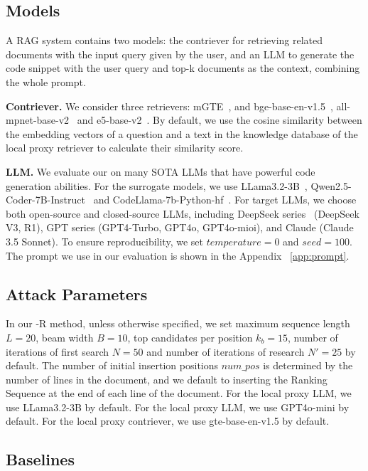 \subsection{Models}\label{subsec:models}
A RAG system contains two models: the contriever for retrieving related documents with the input query given by the user, and an LLM to generate the code snippet with the user query and top-k documents as the context, combining the whole prompt.

\textbf{Contriever.} We consider three retrievers: mGTE~\citep{mgte}, and bge-base-en-v1.5~\citep{bgeM3_embeddingmode}, all-mpnet-base-v2~\citep{all-mpnet} and e5-base-v2~\citep{e5-base}. 
By default, we use the cosine similarity between the embedding vectors of a question and a text in the knowledge database of the local proxy retriever to calculate their similarity score. 

\textbf{LLM.} We evaluate our \method on many SOTA LLMs that have powerful code generation abilities. For the surrogate models, we use LLama3.2-3B~\cite{llama3}, Qwen2.5-Coder-7B-Instruct~\citep{hui2024qwen2} and CodeLlama-7b-Python-hf~\cite{codellama}. For target LLMs, we choose both open-source and closed-source LLMs, including DeepSeek series~\citep{deepseekr1} (DeepSeek V3, R1), GPT series (GPT4-Turbo, GPT4o, GPT4o-mioi),  and Claude (Claude 3.5 Sonnet). To ensure reproducibility, we set $temperature=0$ and $seed=100$. The prompt we use in our evaluation is shown in the Appendix ~\autoref{app:prompt}.


\subsection{Attack Parameters}
In our \method-R method, unless otherwise specified, we set maximum sequence length $L=20$, beam width $B=10$, top candidates per position $k_b=15$, number of iterations of first search $N=50$ and number of iterations of research $N'=25$ by default. The number of initial insertion positions $\mathit{num\_pos}$ is determined by the number of lines in the document, and we default to inserting the Ranking Sequence at the end of each line of the document. For the local proxy LLM, we use LLama3.2-3B by default. For the local proxy LLM, we use GPT4o-mini by default. For the local proxy contriever, we use gte-base-en-v1.5 by default.


\subsection{Baselines}


